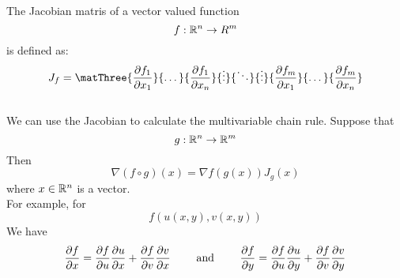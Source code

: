 \documentclass[12pt]{article}
\begin{document}
    The Jacobian matris of a vector valued function
    \[ f: \mathbb{R}^n \to R^m \]
    is defined as:
    \[   J_f =
        \matThree{\partialdd{f_1}{x_1}}
        {\dots}
        {\partialdd{f_1}{x_n}}
        {\vdots}
        {\ddots}
        {\vdots}
        {\partialdd{f_m}{x_1}}
        {\dots}
        {\partialdd{f_m}{x_n}}
    \] \\

    We can use the Jacobian to calculate
    the multivariable chain rule.
    Suppose that
    \[ g: \mathbb{R}^n \to \mathbb{R}^m \]
    Then
    \[ \nabla(f \circ g)(x) = \nabla f(g(x))J_g(x) \]
    where $x \in \mathbb{R}^n$ is a vector. \\ 
    For example, for 
    \[ f(u(x, y), v(x, y)) \]
    We have
    \[ \dfrac{\partial f}{\partial x} = \dfrac{\partial f}{\partial u}\dfrac{\partial u}{\partial x}
    + \dfrac{\partial f}{\partial v}\dfrac{\partial v}{\partial x} 
    \qquad \text{ and } \qquad   
    \dfrac{\partial f}{\partial y} = \dfrac{\partial f}{\partial u}\dfrac{\partial u}{\partial y}
    + \dfrac{\partial f}{\partial v}\dfrac{\partial v}{\partial y} 
    \]
\end{document}

